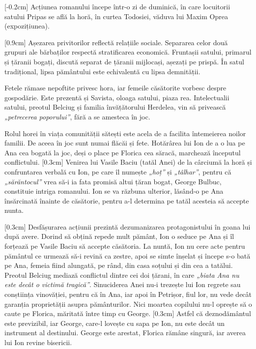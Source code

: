 [-0.2cm]
Acțiunea romanului începe într-o zi de duminică, în care locuitorii satului Pripas se află la horă, în curtea Todosiei, văduva lui Maxim Oprea (expozițiunea).

[0.9cm]
Așezarea privitorilor reflectă relațiile sociale. Separarea celor două grupuri ale bărbaților respectă stratificarea economică. Fruntașii satului, primarul și țăranii bogați, discută separat de țăranii mijlocași, așezați pe prispă. În satul tradițional, lipsa pământului este echivalentă cu lipsa demnității.

Fetele rămase nepoftite privesc hora, iar femeile căsătorite vorbesc despre gospodărie. Este prezentă și Savista, oloaga satului, piaza rea. Intelectualii satului, preotul Belciug și familia învățătorului Herdelea, vin să privească \textit{„petrecerea poporului”}, fără a se amesteca în joc.

Rolul horei în viața comunității sătești este acela de a facilita întemeierea noilor familii. De aceea în joc sunt numai flăcăi și fete. Hotărârea lui Ion de a o lua pe Ana cea bogată la joc, deși o place pe Florica cea săracă, marchează începutul conflictului.
[0.3cm]
Venirea lui Vasile Baciu (tatăl Anei) de la cârciumă la horă și confruntarea verbală cu Ion, pe care îl numește \textit{„hoț”} și \textit{„tâlhar”}, pentru că \textit{„sărăntocul”} vrea să-i ia fata promisă altui țăran bogat, George Bulbuc, constituie intriga romanului. Ion se va răzbuna ulterior, lăsând-o pe Ana însărcinată înainte de căsătorie, pentru a-l determina pe tatăl acesteia să accepte nunta.

[0.3cm]
Desfășurarea acțiunii prezintă dezumanizarea protagonistului în goana lui după avere. Dorind să obțină repede mult pământ, Ion o seduce pe Ana și îl forțează pe Vasile Baciu să accepte căsătoria. La nuntă, Ion nu cere acte pentru pământul ce urmează să-i revină ca zestre, apoi se simte înșelat și începe s-o bată pe Ana, femeia fiind alungată, pe rând, din casa soțului și din cea a tatălui. Preotul Belciug mediază conflictul dintre cei doi țărani, în care \textit{„biata Ana nu este decât o victimă tragică”}. Sinuciderea Anei nu-i trezește lui Ion regrete sau conștiința vinovăției, pentru că în Ana, iar apoi în Petrișor, fiul lor, nu vede decât garanția  proprietății asupra pământurilor. Nici moartea copilului nu-l oprește să o caute pe Florica, măritată între timp cu George.
[0.3cm]
Astfel că deznodământul este previzibil, iar George, care-l lovește cu sapa pe Ion, nu este decât un instrument al destinului. George este arestat, Florica rămâne singură, iar averea lui Ion revine bisericii.

